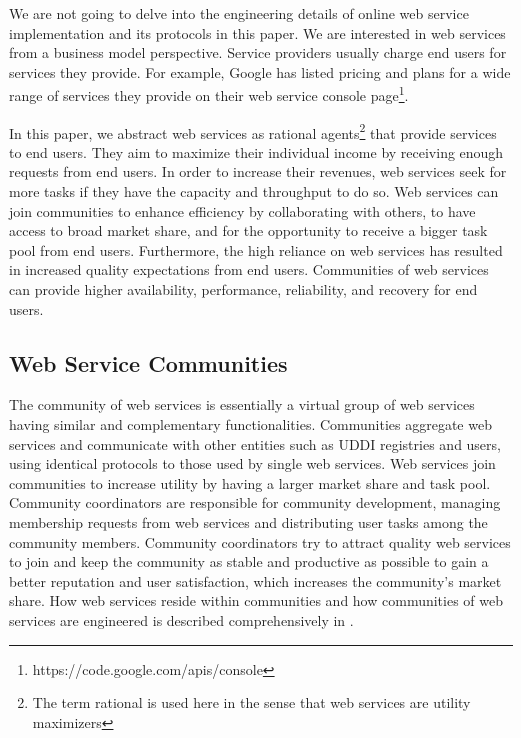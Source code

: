 \documentclass[10pt,journal,cspaper,compsoc]{IEEEtran}
\begin{document}
We are not going to delve into the engineering details of online web service implementation and its protocols in this paper. We are interested in web services from a business model perspective. Service providers usually charge end users for services they provide. For example, Google has listed pricing and plans for a wide range of services they provide on their web service console page\footnote{https://code.google.com/apis/console}.

In this paper, we abstract web services as rational agents\footnote{The term rational is used here in the sense that web services are utility maximizers} that provide services to end users. They aim to maximize their individual income  by receiving enough requests from end users. In order to increase their revenues, web services seek for more tasks if they have the capacity and throughput to do so. Web services can join communities to enhance efficiency by collaborating with others, to have access to broad market share, and for the opportunity to receive a bigger task pool from end users. Furthermore, the high reliance on web services has resulted in increased quality expectations from end users. Communities of web services can provide higher availability, performance, reliability, and recovery for end users.

\subsection{Web Service Communities}\label{s:wsc}

The community of web services is essentially a virtual group of web services having similar and complementary functionalities\cite{DBLP:journals/ijebr/MaamarSTBB09}. Communities aggregate web services and communicate with other entities such as UDDI registries and users, using identical protocols to those used by single web services. Web services join communities to increase utility by having a larger market share and task pool. Community coordinators are responsible for community development, managing membership requests from web services and distributing user tasks among the community members. Community coordinators try to attract quality web services to join and keep the community as stable and productive as possible to gain a better reputation and user satisfaction, which increases the community's market share. How web services reside within communities and how communities of web services are engineered is described comprehensively in \cite{DBLP:journals/ijebr/MaamarSTBB09}.
\end{document}
